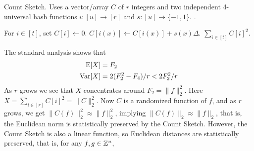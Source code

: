 \begin{algorithm}[H]
   \caption{\label{alg:count-sketch} Count Sketch. Uses a
      vector/array $C$ of $r$ integers and two independent
      4-universal hash functions $i:[u]\to[r]$ and $s:[u]\to\{-1,1\}$.
   .}
   \begin{algorithmic}
         \State For $i\in[t]$, set $C[i]\gets 0$.
      \EndProcedure
         \State $C[i(x)]\gets C[i(x)]+s(x) \Delta$. 
      \EndProcedure
         \State \Return $\sum_{i\in[t]} C[i]^2$.
      \EndProcedure
   \end{algorithmic}
\end{algorithm}
The standard analysis \cite{charikar04count-sketch} shows that 
\begin{align}
   \operatorname*{E}[X]&= F_2 \label{eq:E-F2}\\
   \operatorname*{Var}[X]&=2(F_2^2 - F_4)/r<2F_2^2/r \label{eq:V-F2}
\end{align}
As $r$ grows we see that $X$ concentrates around $F_2=\|f\|^2_2$. Here
$X=\sum_{i\in[r]} C[i]^2=\|C\|^2_2$. Now $C$ is a randomized function
of $f$, and as $r$ grows, we get $\|C(f)\|^2_2\approx\|f\|^2_2$,
implying $\|C(f)\|_2\approx\|f\|_2$, that is, the Euclidean norm is
statistically preserved by the Count Sketch. However, the Count Sketch
is also a linear function, so Euclidean distances are statistically
preserved, that is, for any $f,g\in \mathbb Z^u$,
